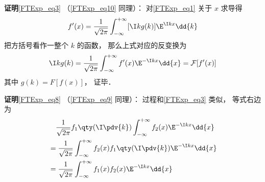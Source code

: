 \textbf{证明}\autoref{FTExp_eq3} （\autoref{FTExp_eq10} 同理）： 对\autoref{FTExp_eq1} 关于 $x$ 求导得
\begin{equation}
f'(x) = \frac{1}{\sqrt{2\pi }} \int_{-\infty }^{+\infty } [\I kg(k)]\E^{\I kx} \dd{k}
\end{equation}
把方括号看作一整个 $k$ 的函数， 那么上式对应的反变换为
\begin{equation}
\I kg(k) = \frac{1}{\sqrt{2\pi }} \int_{-\infty }^{+\infty } f'(x) \E^{-\I kx} \dd{x} = \mathcal F [f'(x)]
\end{equation}
其中 $g(k) = F [f(x)]$， 证毕．

\textbf{证明}\autoref{FTExp_eq8} （\autoref{FTExp_eq9} 同理）： 过程和\autoref{FTExp_eq3} 类似， 等式右边为
\begin{equation}
\begin{aligned}
& \quad \frac{1}{\sqrt{2\pi }} f_1\qty(\I \pdv{k}) \int_{-\infty }^{+\infty } f_2(x)\E^{-\I kx} \dd{x}\\
&= \frac{1}{\sqrt{2\pi }} \int_{-\infty }^{+\infty } f_2(x) f_1\qty(\I \pdv{k})\E^{-\I kx} \dd{x}\\
&= \frac{1}{\sqrt{2\pi }} \int_{-\infty }^{+\infty } f_1(x) f_2(x) \E^{-\I kx} \dd{x}
\end{aligned}
\end{equation}
